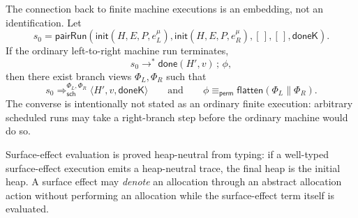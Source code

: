 The connection back to finite machine executions is an embedding, not an
identification. Let
\[
s_0 =
\mathsf{pairRun}(
  \mathsf{init}(H,E,P,e_L^\mu),
  \mathsf{init}(H,E,P,e_R^\mu),
  [\,],[\,],\mathsf{doneK}).
\]
If the ordinary left-to-right machine run terminates,
\[
s_0\longrightarrow^{*}\mathsf{done}(H',v)\,;\,\phi,
\]
then there exist branch views $\Phi_L,\Phi_R$ such that
\[
s_0\Longrightarrow_{\mathsf{sch}}^{\Phi_L,\Phi_R}
  \langle H',v,\mathsf{doneK}\rangle
\qquad\text{and}\qquad
\phi\equiv_{\mathsf{perm}}
\mathsf{flatten}(\Phi_L\parallel\Phi_R).
\]
The converse is intentionally not stated as an ordinary finite execution:
arbitrary scheduled runs may take a right-branch step before the ordinary
machine would do so.

Surface-effect evaluation is proved heap-neutral from typing: if a well-typed
surface-effect execution emits a heap-neutral trace, the final heap is the
initial heap.  A surface effect may \emph{denote} an allocation through an
abstract allocation action without performing an allocation while the
surface-effect term itself is evaluated.
